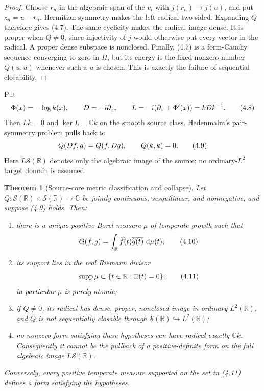 \documentclass[11pt]{article}
\newtheorem{theorem}{Theorem}[section]
\theoremstyle{definition}
\theoremstyle{remark}
\newcommand{\C}{\mathbb C}
\newcommand{\R}{\mathbb R}
\newcommand{\cS}{\mathcal S}
\newcommand{\dd}{\,\mathrm d}
\newcommand{\eqtag}[1]{\qquad\text{\upshape(#1)}}
\begin{document}
\begin{proof}
Choose \(r_n\) in the algebraic span of the \(v_i\) with
\(j(r_n)\to j(u)\), and put \(z_n=u-r_n\).  Hermitian symmetry makes
the left radical two-sided.  Expanding \(Q\) therefore gives (4.7).
The same cyclicity makes the radical image dense.  It is proper when
\(Q\neq0\), since injectivity of \(j\) would otherwise put every vector
in the radical.  A proper dense subspace is nonclosed.  Finally, (4.7)
is a form-Cauchy sequence converging to zero in \(H\), but its energy is
the fixed nonzero number \(Q(u,u)\) whenever such a \(u\) is chosen.
This is exactly the failure of sequential closability.
\end{proof}

Put
\[
 \Phi(x)=-\log k(x),\qquad
 D=-i\partial_x,\qquad
 L=-i(\partial_x+\Phi'(x))=kDk^{-1}.                 \eqtag{4.8}
\]
Then \(Lk=0\) and \(\ker L=\C k\) on the smooth source class.
Hedenmalm's pair-symmetry problem pulls back to
\[
 Q(Df,g)=Q(f,Dg),\qquad Q(k,k)=0.                    \eqtag{4.9}
\]
Here \(L\cS(\R)\) denotes only the algebraic image of the source;
no ordinary-\(L^2\) target domain is assumed.

\begin{theorem}[Source-core metric classification and collapse]
\label{thm:metric}
Let \(Q:\cS(\R)\times\cS(\R)\to\C\) be jointly continuous,
sesquilinear, and nonnegative, and suppose (4.9) holds.
Then:
\begin{enumerate}[label=\textup{(\roman*)}]
\item there is a unique positive Borel measure \(\mu\) of temperate
      growth such that
      \[
       Q(f,g)=\int_{\R}\widehat f(t)
              \overline{\widehat g(t)}\,\dd\mu(t);   \eqtag{4.10}
      \]
\item its support lies in the real Riemann divisor
      \[
       \operatorname{supp}\mu
       \subset\{t\in\R:\Xi(t)=0\};                   \eqtag{4.11}
      \]
      in particular \(\mu\) is purely atomic;
\item if \(Q\neq0\), its radical has dense, proper, nonclosed image
      in ordinary \(L^2(\R)\), and \(Q\) is not sequentially closable
      through \(\cS(\R)\hookrightarrow L^2(\R)\);
\item no nonzero form satisfying these hypotheses can have radical
      exactly \(\C k\).  Consequently it cannot be the pullback of a
      positive-definite form on the full algebraic image
      \(L\cS(\R)\).
\end{enumerate}
Conversely, every positive temperate measure supported on the set in
(4.11) defines a form satisfying the hypotheses.
\end{theorem}
\end{document}
